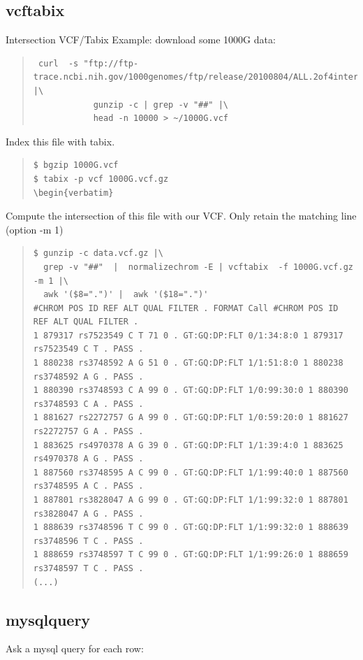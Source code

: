\documentclass[12pt]{article}
\begin{document}
\subsection{vcftabix}
Intersection VCF/Tabix
Example: download some 1000G data:
\begin{quote}
\begin{verbatim}
 curl  -s "ftp://ftp-trace.ncbi.nih.gov/1000genomes/ftp/release/20100804/ALL.2of4intersection.20100804.sites.vcf.gz" |\
            gunzip -c | grep -v "##" |\
            head -n 10000 > ~/1000G.vcf
\end{verbatim}
\end{quote}
Index this file with tabix.
\begin{quote}
\begin{verbatim}
$ bgzip 1000G.vcf
$ tabix -p vcf 1000G.vcf.gz
\begin{verbatim}
\end{verbatim}
\end{quote}
Compute the intersection of this file with our VCF. Only retain the matching line (option -m 1)
\begin{quote}
\begin{verbatim}
$ gunzip -c data.vcf.gz |\
  grep -v "##"  |  normalizechrom -E | vcftabix  -f 1000G.vcf.gz -m 1 |\
  awk '($8=".")' |  awk '($18=".")'
#CHROM POS ID REF ALT QUAL FILTER . FORMAT Call #CHROM POS ID REF ALT QUAL FILTER .
1 879317 rs7523549 C T 71 0 . GT:GQ:DP:FLT 0/1:34:8:0 1 879317 rs7523549 C T . PASS .
1 880238 rs3748592 A G 51 0 . GT:GQ:DP:FLT 1/1:51:8:0 1 880238 rs3748592 A G . PASS .
1 880390 rs3748593 C A 99 0 . GT:GQ:DP:FLT 1/0:99:30:0 1 880390 rs3748593 C A . PASS .
1 881627 rs2272757 G A 99 0 . GT:GQ:DP:FLT 1/0:59:20:0 1 881627 rs2272757 G A . PASS .
1 883625 rs4970378 A G 39 0 . GT:GQ:DP:FLT 1/1:39:4:0 1 883625 rs4970378 A G . PASS .
1 887560 rs3748595 A C 99 0 . GT:GQ:DP:FLT 1/1:99:40:0 1 887560 rs3748595 A C . PASS .
1 887801 rs3828047 A G 99 0 . GT:GQ:DP:FLT 1/1:99:32:0 1 887801 rs3828047 A G . PASS .
1 888639 rs3748596 T C 99 0 . GT:GQ:DP:FLT 1/1:99:32:0 1 888639 rs3748596 T C . PASS .
1 888659 rs3748597 T C 99 0 . GT:GQ:DP:FLT 1/1:99:26:0 1 888659 rs3748597 T C . PASS .
(...)
\end{verbatim}
\end{quote}


\subsection{mysqlquery}
Ask a mysql query for each row:
\end{document}
